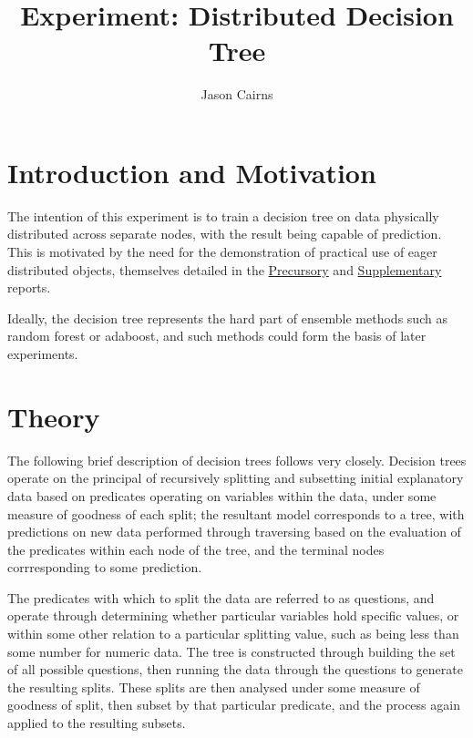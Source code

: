 \documentclass[a4paper,10pt]{article}
\begin{document}
\title{Experiment: Distributed Decision Tree}
\author{Jason Cairns}
  
\maketitle

\section{Introduction and Motivation}

The intention of this experiment is to train a decision tree on data physically
distributed across separate nodes, with the result being capable of prediction.
This is motivated by the need for the demonstration of practical use of eager
distributed objects, themselves detailed in the
\href{experiment-eager-dist-obj-pre.pdf}{Precursory} and
\href{experiment-eager-dist-obj-supp.pdf}{Supplementary} reports.

Ideally, the decision tree represents the hard part of ensemble methods such as
random forest or adaboost, and such methods could form the basis of later
experiments.

\section{Theory}

The following brief description of decision trees follows
\citeauthor{breiman1993trees} very closely.
Decision trees operate on the principal of recursively splitting and subsetting
initial explanatory data based on predicates operating on variables within the
data, under some measure of goodness of each split; the resultant model
corresponds to a tree, with predictions on new data performed through
traversing based on the evaluation of the predicates within each node of the
tree, and the terminal nodes corrresponding to some prediction.

The predicates with which to split the data are referred to as questions, and
operate through determining whether particular variables hold specific values,
or within some other relation to a particular splitting value, such as being
less than some number for numeric data.
The tree is constructed through building the set of all possible questions,
then running the data through the questions to generate the resulting splits.
These splits are then analysed under some measure of goodness of split, then
subset by that particular predicate, and the process again applied to the
resulting subsets.
\end{document}
